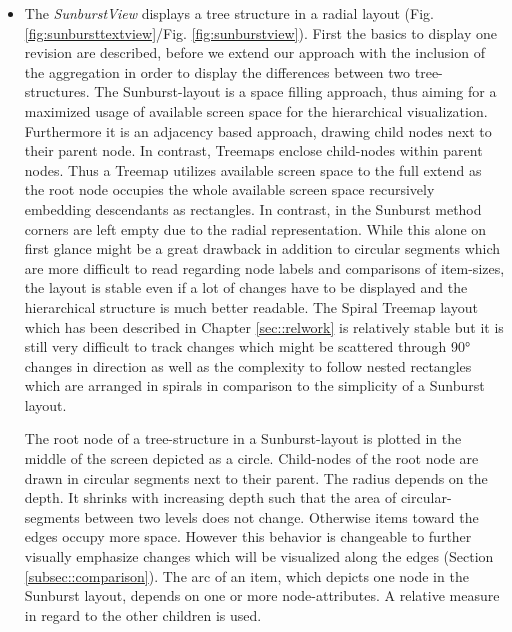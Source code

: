 \begin{itemize}
\item
The \emph{SunburstView} displays a tree structure in a radial layout (Fig. \ref{fig:sunbursttextview}/Fig. \ref{fig:sunburstview}). First the basics to display one revision are described, before we extend our approach with the inclusion of the aggregation in order to display the differences between two tree-structures. The Sunburst-layout is a space filling approach, thus aiming for a maximized usage of available screen space for the hierarchical visualization. Furthermore it is an adjacency based approach, drawing child nodes next to their parent node. In contrast, Treemaps enclose child-nodes within parent nodes. Thus a Treemap utilizes available screen space to the full extend as the root node occupies the whole available screen space recursively embedding descendants as rectangles. In contrast, in the Sunburst method corners are left empty due to the radial representation. While this alone on first glance might be a great drawback in addition to circular segments which are more difficult to read regarding node labels and comparisons of item-sizes, the layout is stable even if a lot of changes have to be displayed and the hierarchical structure is much better readable. The Spiral Treemap layout which has been described in Chapter \ref{sec::relwork} is relatively stable but it is still very difficult to track changes which might be scattered through 90° changes in direction as well as the complexity to follow nested rectangles which are arranged in spirals in comparison to the simplicity of a Sunburst layout.

The root node of a tree-structure in a Sunburst-layout is plotted in the middle of the screen depicted as a circle. Child-nodes of the root node are drawn in circular segments next to their parent. The radius depends on the depth. It shrinks with increasing depth such that the area of circular-segments between two levels does not change. Otherwise items toward the edges occupy more space. However this behavior is changeable to further visually emphasize changes which will be visualized along the edges (Section \ref{subsec::comparison}). The arc of an item, which depicts one node in the Sunburst layout, depends on one or more node-attributes. A relative measure in regard to the other children is used.


\end{itemize}
